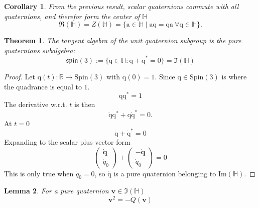 \documentclass{amsart}
\newtheorem{theorem}{Theorem}[section]
\newtheorem{corollary}{Corollary}[theorem]
\newtheorem{lemma}[theorem]{Lemma}
\theoremstyle{definition}
\theoremstyle{remark}
\numberwithin{equation}{section}
\begin{document}
\begin{corollary}
  From the previous result, scalar quaternions commute with all quaternions, and therefor form the center of $\mathbb{H}$
  \begin{equation}
    \Re(\mathbb{H}) = Z(\mathbb{H}) = \{\mathrm{a} \in \mathbb{H} \mid \mathrm{aq}=\mathrm{qa} \ \forall \mathrm{q} \in \mathbb{H}\}.
  \end{equation}
\end{corollary}

\begin{theorem}
  The tangent algebra of the unit quaternion subgroup is the pure quaternions subalgebra:
  \begin{equation}
    \mathfrak{spin}(3) := \{\mathrm{\dot{q}}\in\mathbb{H}: \mathrm{\dot{q}}+\mathrm{\dot{q}}^* = 0\} = \Im(\mathbb{H})
  \end{equation}
\end{theorem}
\begin{proof}
  Let $\mathrm{q}(t): \mathbb{R} \to \mathrm{Spin}(3)$ with $\mathrm{q}(0)=1$. Since $\mathrm{q}\in\mathrm{Spin}(3)$ is where the quadrance is equal to $1$.
  \begin{equation}
    \mathrm{q}\mathrm{q}^*=1 \nonumber
  \end{equation}
  The derivative w.r.t. $t$ is then
  \begin{equation}
    \mathrm{\dot{q}}\mathrm{q}^* + \mathrm{q}\mathrm{\dot{q}}^* = 0. \nonumber
  \end{equation}
  At $t=0$
  \begin{equation}
    \mathrm{\dot{q}} + \mathrm{\dot{q}}^* = 0 \nonumber
  \end{equation}
  Expanding to the scalar plus vector form
  \begin{equation}
    \begin{pmatrix}
      \dot{\mathbf{q}} \\
      \dot{q}_0
    \end{pmatrix} +
    \begin{pmatrix}
      - \dot{\mathbf{q}} \\
      \dot{q}_0
    \end{pmatrix} = 0 \nonumber
  \end{equation}
  This is only true when $\dot{q}_0=0$, so $\dot{\mathrm{q}}$ is a pure quaternion belonging to $\mathrm{Im}(\mathbb{H})$.
\end{proof}

\begin{lemma}
  For a pure quaternion $\mathbf{v} \in \Im(\mathbb{H})$
  \begin{equation}
    \mathbf{v}^2 = -Q(\mathbf{v})
  \end{equation}
\end{lemma}
\end{document}
